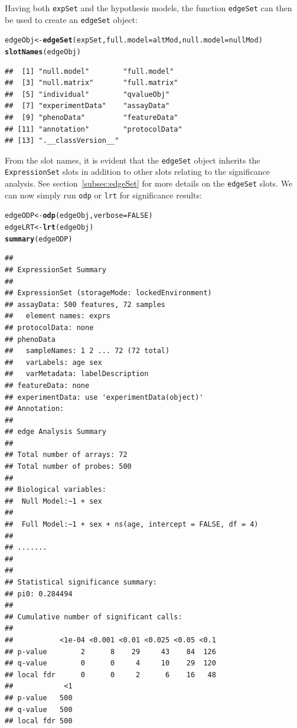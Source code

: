 \documentclass{article}\usepackage[]{graphicx}\usepackage[]{color}
\makeatletter
\newcommand{\hlnum}[1]{\textcolor[rgb]{0.686,0.059,0.569}{#1}}%
\newcommand{\hlstd}[1]{\textcolor[rgb]{0.345,0.345,0.345}{#1}}%
\newcommand{\hlkwb}[1]{\textcolor[rgb]{0.69,0.353,0.396}{#1}}%
\newcommand{\hlkwc}[1]{\textcolor[rgb]{0.333,0.667,0.333}{#1}}%
\newcommand{\hlkwd}[1]{\textcolor[rgb]{0.737,0.353,0.396}{\textbf{#1}}}%
\newenvironment{kframe}{%
 \def\at@end@of@kframe{}%
 \ifinner\ifhmode%
  \def\at@end@of@kframe{\end{minipage}}%
  \begin{minipage}{\columnwidth}%
 \fi\fi%
 \def\FrameCommand##1{\hskip\@totalleftmargin \hskip-\fboxsep
 \colorbox{shadecolor}{##1}\hskip-\fboxsep
     \hskip-\linewidth \hskip-\@totalleftmargin \hskip\columnwidth}%
 \MakeFramed {\advance\hsize-\width
   \@totalleftmargin\z@ \linewidth\hsize
   \@setminipage}}%
 {\par\unskip\endMakeFramed%
 \at@end@of@kframe}
\newenvironment{knitrout}{}{} %
\makeatother
\begin{document}
Having both {\tt expSet} and the hypothesis models, the function {\tt edgeSet} can then be used to create an {\tt edgeSet} object:
\begin{knitrout}
\color{fgcolor}\begin{kframe}
\begin{alltt}
\hlstd{edgeObj} \hlkwb{<-} \hlkwd{edgeSet}\hlstd{(expSet,} \hlkwc{full.model} \hlstd{= altMod,} \hlkwc{null.model} \hlstd{= nullMod)}
\hlkwd{slotNames}\hlstd{(edgeObj)}
\end{alltt}
\begin{verbatim}
##  [1] "null.model"        "full.model"       
##  [3] "null.matrix"       "full.matrix"      
##  [5] "individual"        "qvalueObj"        
##  [7] "experimentData"    "assayData"        
##  [9] "phenoData"         "featureData"      
## [11] "annotation"        "protocolData"     
## [13] ".__classVersion__"
\end{verbatim}
\end{kframe}
\end{knitrout}

From the slot names, it is evident that the {\tt edgeSet} object inherits the {\tt ExpressionSet} slots in addition to other slots relating to the significance analysis. See section~\ref{subsec:edgeSet} for more details on the {\tt edgeSet} slots. We can now simply run {\tt odp} or {\tt lrt} for significance results:
\begin{knitrout}
\color{fgcolor}\begin{kframe}
\begin{alltt}
\hlstd{edgeODP} \hlkwb{<-} \hlkwd{odp}\hlstd{(edgeObj,} \hlkwc{verbose} \hlstd{=} \hlnum{FALSE}\hlstd{)}
\hlstd{edgeLRT} \hlkwb{<-} \hlkwd{lrt}\hlstd{(edgeObj)}
\hlkwd{summary}\hlstd{(edgeODP)}
\end{alltt}
\begin{verbatim}
## 
## ExpressionSet Summary 
##  
## ExpressionSet (storageMode: lockedEnvironment)
## assayData: 500 features, 72 samples 
##   element names: exprs 
## protocolData: none
## phenoData
##   sampleNames: 1 2 ... 72 (72 total)
##   varLabels: age sex
##   varMetadata: labelDescription
## featureData: none
## experimentData: use 'experimentData(object)'
## Annotation:  
## 
## edge Analysis Summary 
##  
## Total number of arrays: 72 
## Total number of probes: 500 
##  
## Biological variables: 
## 	Null Model:~1 + sex
## 
## 	Full Model:~1 + sex + ns(age, intercept = FALSE, df = 4)
## 
## ....... 
##  
## 
## Statistical significance summary:
## pi0:	0.284494	
## 
## Cumulative number of significant calls:
## 
##           <1e-04 <0.001 <0.01 <0.025 <0.05 <0.1
## p-value        2      8    29     43    84  126
## q-value        0      0     4     10    29  120
## local fdr      0      0     2      6    16   48
##            <1
## p-value   500
## q-value   500
## local fdr 500
\end{verbatim}
\end{kframe}
\end{knitrout}
\end{document}
